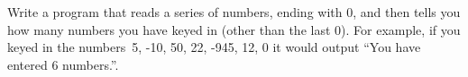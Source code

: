Write a program that reads a series of numbers, ending with 0, and then tells you how
many numbers you have keyed in (other than the last 0).  For example, if you keyed in the
numbers~5, -10, 50, 22, -945, 12, 0 it would output ``You have entered 6
numbers.''.









